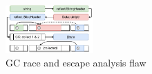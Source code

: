 \begin{figure}[!t]
    \centering
    \includegraphics[width=0.3\textwidth]{gfx/figures/gcrace-vuln.pdf}
    \caption{GC race and escape analysis flaw}
    \label{fig:gcrace-vuln}
    \vspace{-9pt}
\end{figure}

